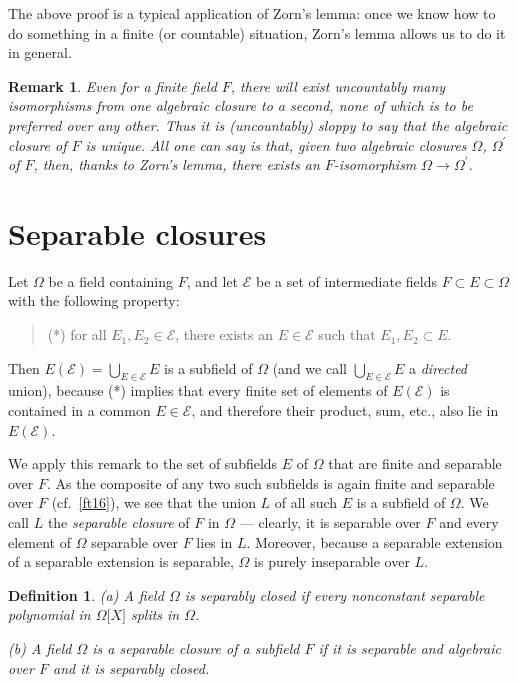 \documentclass[a4paper,11pt,final,openany]{memoir}
\newtheorem{definition}[X]{Definition}
\newtheorem{remark}[X]{Remark}
\theoremstyle{nonumberplain}
\begin{document}
The above proof is a typical application of Zorn's lemma: once we know how to
do something in a finite (or countable) situation, Zorn's lemma allows us to
do it in general.

\begin{remark}
\label{sf17}Even for a finite field $F$, there will exist uncountably many
isomorphisms from one algebraic closure to a second, none of which is to be
preferred over any other. Thus it is (uncountably) sloppy to say that the
algebraic closure of $F$ is unique. All one can say is that, given two
algebraic closures $\Omega$, $\Omega^{\prime}$ of $F$, then, thanks to Zorn's
lemma, there exists an $F$-isomorphism $\Omega\rightarrow\Omega^{\prime}$.
\end{remark}

\section{Separable closures}

Let $\Omega$ be a field containing $F$, and let $\mathcal{E}{}$ be a set of
intermediate fields $F\subset E\subset\Omega$ with the following property:

\begin{quote}
(*) for all $E_{1},E_{2}\in\mathcal{E}{}$, there exists an $E\in\mathcal{E}{}$
such that $E_{1},E_{2}\subset E$.
\end{quote}

\noindent Then $E(\mathcal{E}{})=\bigcup_{E\in\mathcal{E}{}}E$ is a subfield
of $\Omega$ (and we call $\bigcup_{E\in\mathcal{E}{}}E$ a \emph{directed
}union), because (*) implies that every finite set of elements of
$E(\mathcal{E}{})$ is contained in a common $E\in\mathcal{E}{}$, and therefore
their product, sum, etc., also lie in $E(\mathcal{E}{})$.

We apply this remark to the set of subfields $E$ of $\Omega$ that are finite
and separable over $F$. As the composite of any two such subfields is again
finite and separable over $F$ (cf.\ \ref{ft16}), we see that the union $L$ of
all such $E$ is a subfield of $\Omega$. We call $L$ the \emph{separable
closure }of $F$ in $\Omega$ --- clearly, it is separable over $F$ and every
element of $\Omega$ separable over $F$ lies in $L$. Moreover, because a
separable extension of a separable extension is separable, $\Omega$ is purely
inseparable over $L$.

\begin{definition}
\label{sf18}(a) A field $\Omega$ is
\emph{separably closed }if every nonconstant separable polynomial in
$\Omega\lbrack X]$ splits in $\Omega$.

(b) A field $\Omega$ is a%
\emph{separable closure }of a subfield $F$ if it is separable and algebraic
over $F$ and it is separably closed.
\end{definition}
\end{document}
